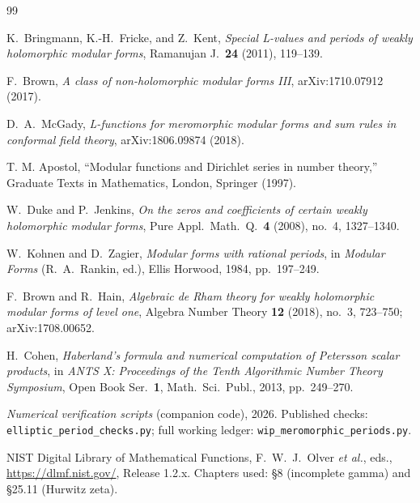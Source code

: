\documentclass[11pt]{article}
\begin{document}
\begin{thebibliography}{99}

K.\ Bringmann, K.-H.\ Fricke, and Z.\ Kent,
\emph{Special L-values and periods of weakly holomorphic modular forms},
Ramanujan J.\ \textbf{24} (2011), 119--139.

F.\ Brown, \emph{A class of non-holomorphic modular forms III},
arXiv:1710.07912 (2017).

D.\ A.\ McGady,
\emph{L-functions for meromorphic modular forms and sum rules in
conformal field theory},
arXiv:1806.09874 (2018).

T. M. Apostol,
``Modular functions and Dirichlet series in number theory,''
Graduate Texts in Mathematics, London, Springer (1997).


W.\ Duke and P.\ Jenkins,
\emph{On the zeros and coefficients of certain weakly holomorphic modular forms},
Pure Appl.\ Math.\ Q.\ \textbf{4} (2008), no.\ 4, 1327--1340.

W.\ Kohnen and D.\ Zagier,
\emph{Modular forms with rational periods},
in \emph{Modular Forms} (R.~A.\ Rankin, ed.), Ellis Horwood, 1984, pp.\ 197--249.



F.\ Brown and R.\ Hain,
\emph{Algebraic de Rham theory for weakly holomorphic modular forms of level one},
Algebra Number Theory \textbf{12} (2018), no.\ 3, 723--750; arXiv:1708.00652.

H.\ Cohen,
\emph{Haberland's formula and numerical computation of Petersson scalar products},
in \emph{ANTS X: Proceedings of the Tenth Algorithmic Number Theory Symposium},
Open Book Ser.\ \textbf{1}, Math.\ Sci.\ Publ., 2013, pp.\ 249--270.

\emph{Numerical verification scripts} (companion code), 2026.
Published checks: \texttt{elliptic\_period\_checks.py}; full working ledger:
\texttt{wip\_meromorphic\_periods.py}.

NIST Digital Library of Mathematical Functions,
F.~W.~J.\ Olver \emph{et al.}, eds.,
\url{https://dlmf.nist.gov/}, Release 1.2.x.
Chapters used: \S8 (incomplete gamma) and \S25.11 (Hurwitz zeta).


\end{thebibliography}
\end{document}
